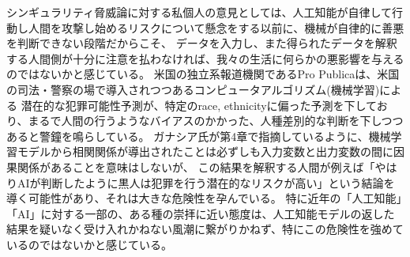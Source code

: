 \documentclass[uplatex]{jsarticle}
\begin{document}
シンギュラリティ脅威論に対する私個人の意見としては、人工知能が自律して行動し人間を攻撃し始めるリスクについて懸念をする以前に、機械が自律的に善悪を判断できない段階だからこそ、
データを入力し、また得られたデータを解釈する人間側が十分に注意を払わなければ、我々の生活に何らかの悪影響を与えるのではないかと感じている。
米国の独立系報道機関であるPro Publicaは、米国の司法・警察の場で導入されつつあるコンピュータアルゴリズム(機械学習)による
潜在的な犯罪可能性予測が、特定のrace, ethnicityに偏った予測を下しており、まるで人間の行うようなバイアスのかかった、人種差別的な判断を下しつつあると警鐘を鳴らしている。
ガナシア氏が第4章で指摘しているように、機械学習モデルから相関関係が導出されたことは必ずしも入力変数と出力変数の間に因果関係があることを意味はしないが、
この結果を解釈する人間が例えば「やはりAIが判断したように黒人は犯罪を行う潜在的なリスクが高い」という結論を導く可能性があり、それは大きな危険性を孕んでいる。
特に近年の「人工知能」「AI」に対する一部の、ある種の崇拝に近い態度は、人工知能モデルの返した結果を疑いなく受け入れかねない風潮に繋がりかねず、特にこの危険性を強めているのではないかと感じている。
\end{document}
